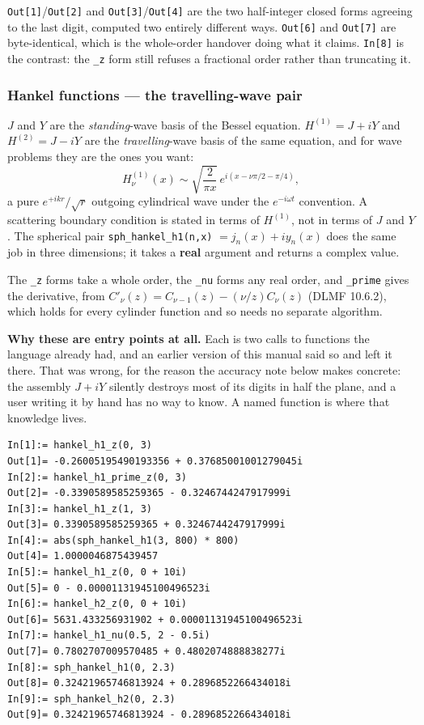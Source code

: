 \documentclass[11pt]{article}
\newcommand{\code}[1]{\texttt{#1}}
\begin{document}
\code{Out[1]}/\code{Out[2]} and \code{Out[3]}/\code{Out[4]} are the two
half-integer closed forms agreeing to the last digit, computed two
entirely different ways. \code{Out[6]} and \code{Out[7]} are
byte-identical, which is the whole-order handover doing what it claims.
\code{In[8]} is the contrast: the \code{\_z} form still refuses a
fractional order rather than truncating it.

\subsubsection*{Hankel functions --- the travelling-wave pair}

$J$ and $Y$ are the \emph{standing}-wave basis of the Bessel equation.
$H^{(1)} = J + iY$ and $H^{(2)} = J - iY$ are the \emph{travelling}-wave
basis of the same equation, and for wave problems they are the ones you
want:
\[
  H^{(1)}_\nu(x) \sim \sqrt{\frac{2}{\pi x}}\,
    e^{i(x - \nu\pi/2 - \pi/4)},
\]
a pure $e^{+ikr}/\sqrt{r}$ outgoing cylindrical wave under the
$e^{-i\omega t}$ convention. A scattering boundary condition is stated
in terms of $H^{(1)}$, not in terms of $J$ and $Y$. The spherical pair
\code{sph\_hankel\_h1(n,x)} $= j_n(x) + iy_n(x)$ does the same job in
three dimensions; it takes a \textbf{real} argument and returns a
complex value.

The \code{\_z} forms take a whole order, the \code{\_nu} forms any real
order, and \code{\_prime} gives the derivative, from
$C'_\nu(z) = C_{\nu-1}(z) - (\nu/z)C_\nu(z)$ (DLMF 10.6.2), which holds
for every cylinder function and so needs no separate algorithm.

\textbf{Why these are entry points at all.} Each is two calls to
functions the language already had, and an earlier version of this
manual said so and left it there. That was wrong, for the reason the
accuracy note below makes concrete: the assembly $J + iY$ silently
destroys most of its digits in half the plane, and a user writing it by
hand has no way to know. A named function is where that knowledge lives.

\begin{lstlisting}
In[1]:= hankel_h1_z(0, 3)
Out[1]= -0.26005195490193356 + 0.37685001001279045i
In[2]:= hankel_h1_prime_z(0, 3)
Out[2]= -0.3390589585259365 - 0.3246744247917999i
In[3]:= hankel_h1_z(1, 3)
Out[3]= 0.3390589585259365 + 0.3246744247917999i
In[4]:= abs(sph_hankel_h1(3, 800) * 800)
Out[4]= 1.0000046875439457
In[5]:= hankel_h1_z(0, 0 + 10i)
Out[5]= 0 - 0.00001131945100496523i
In[6]:= hankel_h2_z(0, 0 + 10i)
Out[6]= 5631.433256931902 + 0.00001131945100496523i
In[7]:= hankel_h1_nu(0.5, 2 - 0.5i)
Out[7]= 0.7802707009570485 + 0.4802074888838277i
In[8]:= sph_hankel_h1(0, 2.3)
Out[8]= 0.32421965746813924 + 0.2896852266434018i
In[9]:= sph_hankel_h2(0, 2.3)
Out[9]= 0.32421965746813924 - 0.2896852266434018i
\end{lstlisting}
\end{document}
